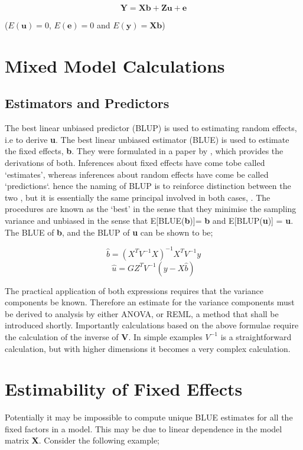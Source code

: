 \documentclass[12pt, a4paper]{report}
\theoremstyle{plain}
\theoremstyle{definition}
\theoremstyle{remark}
\begin{document}
\begin{equation}
\textbf{Y} = \textbf{Xb} + \textbf{Zu} + \textbf{e}
\end{equation}

($E(\textbf{u})=0$, $E(\textbf{e})=0 $ and $E(\textbf{y}) =
\textbf{Xb}$)

\section{Mixed Model Calculations}

\subsection{Estimators and Predictors}

The best linear unbiased predictor (BLUP) is used to estimating
random effects, i.e to derive \textbf{u}. The best linear unbiased
estimator (BLUE) is used to estimate the fixed effects,
\textbf{b}. They were formulated in a paper by \cite{Henderson59},
which provides the derivations of both. Inferences about fixed
effects have come tobe called `estimates', whereas inferences
about random effects have come be called `predictions`. hence the
naming of BLUP is to reinforce distinction between the two , but
it is essentially the same principal involved in both cases,
\citep{Robinson}. The procedures are known as the `best' in the
sense that they minimise the sampling variance and unbiased in the
sense that E[BLUE(\textbf{b})]= \textbf{b} and E[BLUP(\textbf{u})]
= \textbf{u}. The BLUE of \textbf{b}, and the BLUP of \textbf{u}
can be shown to be;

\begin{equation}
\hat{b} = (X^{T}V^{-1}X)^{-1}X^{T}V^{-1}y
\end{equation}
\begin{equation}
\hat{u} = GZ^{T}V^{-1}(y-X\hat{b})
\end{equation}

The practical application of both expressions requires that the
variance components be known. Therefore an estimate for the
variance components must be derived to analysis by either ANOVA,
or REML, a method that shall be introduced shortly. Importantly
calculations based on the above formulae require the calculation
of the inverse of \textbf{V}. In simple examples $V^{-1}$ is a
straightforward calculation, but with higher dimensions it becomes
a very complex calculation.




\section{Estimability of Fixed Effects}
Potentially it may be impossible to compute unique BLUE estimates for all the fixed factors in a model. This may be due to linear dependence in the model
matrix \textbf{X}. Consider the following example;
\end{document}
